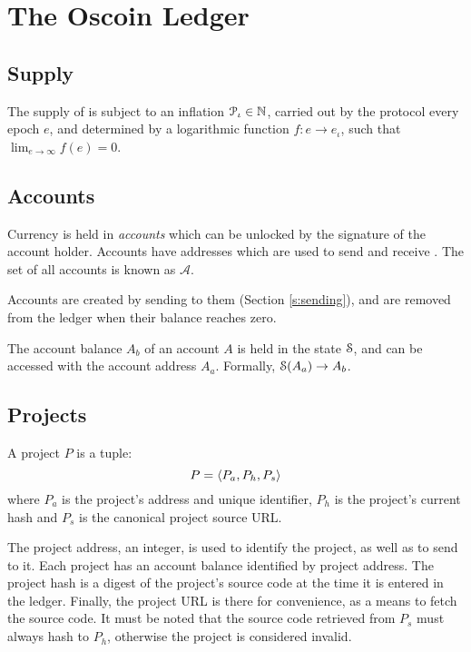 \section{The Oscoin Ledger}
\label{s:ledger}


\subsection{Supply}

The supply of \oscoin{} is subject to an inflation $\mathcal{P}_{\iota} \in
\mathbb{N}$, carried out by the protocol every epoch $e$, and determined by a
logarithmic function $f : e \to e_{\iota}$, such that $\lim_{e \to \infty} f(e)
= 0$.

\subsection{Accounts}
\label{s:accounts}

Currency is held in \emph{accounts} which can be unlocked by the signature of
the account holder. Accounts have addresses which are used to send and receive
\oscoin{}. The set of all accounts is known as $\mathcal{A}$.

Accounts are created by sending \oscoin{} to them (Section \ref{s:sending}),
and are removed from the ledger when their balance reaches zero.

The account balance $A_b$ of an account $A$ is held in the state $\mathcal{S}$, and
can be accessed with the account address $A_a$. Formally, $\mathcal{S}(A_a) \to A_b$.

\subsection{Projects}
\label{s:projects}

A project $P$ is a tuple:
\[
    P = \langle P_a, P_h, P_s\rangle
\]
where $P_{a}$ is the project's address and unique identifier, $P_h$ is
the project's current hash and $P_s$ is the canonical project source
URL.

The project address, an integer, is used to identify the project, as
well as to send \oscoin{} to it. Each project has an account balance
identified by project address. The project hash is a digest of the
project's source code at the time it is entered in the
ledger. Finally, the project URL is there for convenience, as a means
to fetch the source code.  It must be noted that the source code
retrieved from $P_s$ must always hash to $P_h$, otherwise the project
is considered invalid.

